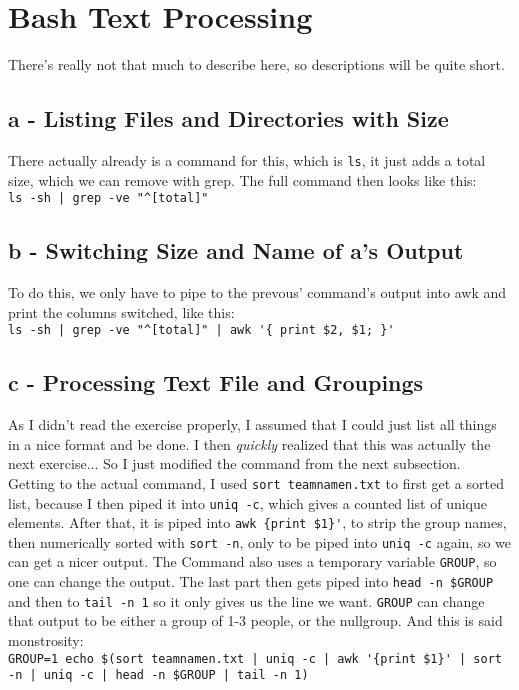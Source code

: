 \documentclass[a4paper, 11pt]{article}
\begin{document}
    \section{Bash Text Processing}
    There's really not that much to describe here, so descriptions will be quite short.
    
    \subsection{a - Listing Files and Directories with Size}
    There actually already is a command for this, which is \texttt{ls}, it just adds a total size, which we can 
    remove with grep. The full command then looks like this:\\ 
    \lstinline{ls -sh | grep -ve "^[total]"}

    \subsection{b - Switching Size and Name of a's Output}
    To do this, we only have to pipe to the prevous' command's output into awk and print the columns switched, 
    like this:\\
    \lstinline+ls -sh | grep -ve "^[total]" | awk '{ print $2, $1; }'+

    \subsection{c - Processing Text File and Groupings}
    As I didn't read the exercise properly, I assumed that I could just list all things in a nice format and be done.
    I then \textit{quickly} realized that this was actually the next exercise... So I just modified the command from the next subsection.
    Getting to the actual command, I used \lstinline{sort teamnamen.txt} to first get a sorted list, because I then piped it 
    into \lstinline{uniq -c}, which gives a counted list of unique elements. After that, it is piped into \lstinline+awk {print $1}'+, 
    to strip the group names, then numerically sorted with \lstinline{sort -n}, only to be piped into \lstinline{uniq -c} again, so we can get a nicer output.
    The Command also uses a temporary variable \lstinline{GROUP}, so one can change the output. The last part then gets piped into 
    \lstinline{head -n $GROUP} and then to \lstinline{tail -n 1} so it only gives us the line we want. \texttt{GROUP} can change that output to be either a group 
    of 1-3 people, or the nullgroup. And this is said monstrosity:\\
    \lstinline+GROUP=1 echo $(sort teamnamen.txt | uniq -c | awk '{print $1}' | sort -n | uniq -c | head -n $GROUP | tail -n 1)+ 
\end{document}
